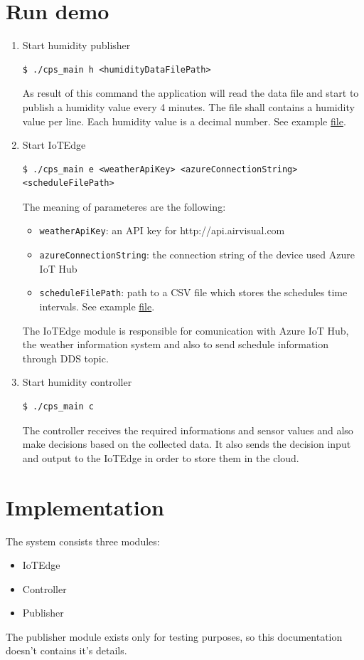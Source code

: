 \documentclass{article}
\begin{document}
\section{Run demo}
\begin{enumerate}
\item Start humidity publisher
\begin{verbatim}
$ ./cps_main h <humidityDataFilePath>
\end{verbatim}

As result of this command the application will read the data file and start to publish a humidity value every 4 minutes. The file shall contains a humidity value per line. Each humidity value is a decimal number. See example \href{https://github.com/antaljanosbenjamin/cps_homework/blob/master/examples/humidity.txt}{file}.
\item Start IoTEdge 
\begin{lstlisting}
$ ./cps_main e <weatherApiKey> <azureConnectionString> <scheduleFilePath>
\end{lstlisting} 
The meaning of parameteres are the following:
\begin{itemize}
\item \verb+weatherApiKey+: an API key for http://api.airvisual.com
\item \verb+azureConnectionString+: the connection string of the device used Azure IoT Hub
\item \verb+scheduleFilePath+: path to a CSV file which stores the schedules time intervals. See example \href{https://github.com/antaljanosbenjamin/cps_homework/blob/master/examples/schedule.csv}{file}.
\end{itemize}

The IoTEdge module is responsible for comunication with Azure IoT Hub, the weather information system and also to send schedule information through DDS topic.
\item Start humidity controller
\begin{verbatim}
$ ./cps_main c
\end{verbatim}

The controller receives the required informations and sensor values and also make decisions based on the collected data. It also sends the decision input and output to the IoTEdge in order to store them in the cloud.
\end{enumerate}
\section{Implementation}
The system consists three modules:
\begin{itemize}
\item IoTEdge
\item Controller
\item Publisher
\end{itemize}
The publisher module exists only for testing purposes, so this documentation doesn't contains it's details.
\end{document}
